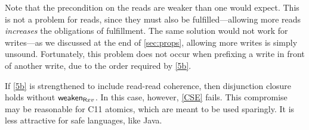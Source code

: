 Note that the precondition on the reads are weaker than one would expect.
This is not a problem for reads, since they must also be fulfilled---allowing
more reads \emph{increases} the obligations of fulfillment.  The same
solution would not work for writes---as we discussed at the end of
\textsection\ref{sec:props}, allowing more writes is simply unsound.
Fortunately, this problem does not occur when prefixing a write in front of
another write, due to the order required by \ref{5b}.

If \ref{5b} is strengthened to include read-read coherence, then disjunction
closure holds without $\mathsf{weaken}_{\mathsf{R}xv}$.  In this case, however,
\ref{CSE} fails.  This compromise may be reasonable for C11 atomics, which
are meant to be used sparingly.  It is less attractive for %
safe languages, like Java.









